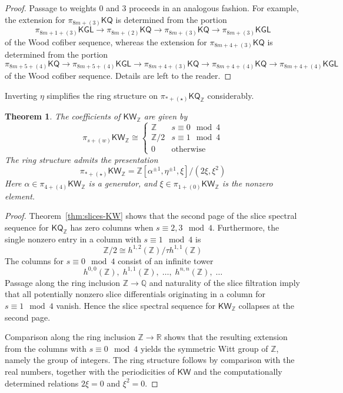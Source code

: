 \documentclass[11pt,hyp,english]{article}
\newcommand{\Z}{\mathbb{Z}}
\newcommand{\Q}{\mathbb{Q}}
\newcommand{\KGL}{\mathsf{KGL}}
\newcommand{\KQ}{\mathsf{KQ}}
\newcommand{\KW}{\mathsf{KW}}
\newcommand{\R}{\mathbb{R}}
\newcommand{\bideg}{(\star)}
\newtheorem{theorem}{Theorem}[section]
\theoremstyle{definition}
\begin{document}
\begin{proof}
Passage to weights $0$ and $3$ proceeds in an analogous fashion.  
For example, the extension for $\pi_{8m+(3)}\KQ$ is determined from the portion
\[
  \pi_{8m+1+(3)}\KGL \to \pi_{8m+(2)}\KQ \to \pi_{8m+(3)}\KQ \to \pi_{8m+(3)}\KGL
\]
of the Wood cofiber sequence, whereas the extension for $\pi_{8m+4+(3)}\KQ$ is determined from the portion
\[
  \pi_{8m+5+(4)}\KQ \to \pi_{8m+5+(4)}\KGL \to \pi_{8m+4+(3)}\KQ \to \pi_{8m+4+(4)}\KQ \to \pi_{8m+4+(4)}\KGL
\]
of the Wood cofiber sequence.  
Details are left to the reader.
\end{proof}
    
Inverting $\eta$ simplifies the ring structure on $\pi_{\ast+\bideg}\KQ_\Z$ considerably.

\begin{theorem}\label{thm:coeff-KW}
The coefficients of $\KW_\Z$ are given by 
\[
  \pi_{s+(w)}\KW_\Z \cong
  \begin{cases} 
    \Z & s \equiv 0 \mod{4} \\ 
    \Z/2 & s \equiv 1 \mod{4} \\ 
    0 & \text{otherwise} 
  \end{cases}
\]
The ring structure admits the presentation
\[
  \pi_{\ast+\bideg}\KW_\Z = \Z[\alpha^{\pm 1}, \eta^{\pm 1}, \xi]/(2\xi,\xi^2)
\]
Here $\alpha \in \pi_{4+(4)}\KW_\Z$ is a generator, and $\xi \in \pi_{1+(0)}\KW_\Z$ is the nonzero element.
\end{theorem}

\begin{proof}
Theorem~\ref{thm:slices-KW} shows that the second page of the slice spectral sequence for $\KQ_\Z$ has zero columns when $s \equiv 2,3 \mod{4}$.  
Furthermore, the single nonzero entry in a column with $s \equiv 1 \mod{4}$ is
\[
  \Z/2 \cong h^{1,2}(\Z) / \tau h^{1,1}(\Z)
\]
The columns for $s \equiv 0 \mod{4}$ consist of an infinite tower 
\[
  h^{0,0}(\Z), \; h^{1,1}(\Z), \; \dotsc, \; h^{n,n}(\Z), \; \dotsc
\]
Passage along the ring inclusion $\Z \to \Q$ and naturality of the slice filtration imply that all potentially nonzero slice differentials originating in a column for $s \equiv 1 \mod{4}$ vanish.  
Hence the slice spectral sequence for $\KW_\Z$ collapses at the second page.  

Comparison along the ring inclusion $\Z \to \R$ shows that the resulting extension from the columns with $s \equiv 0 \mod{4}$ yields the symmetric Witt group of $\Z$, namely the group of integers.  
The ring structure follows by comparison with the real numbers, together with the periodicities of $\KW$ and the computationally determined relations $2\xi = 0$ and $\xi^2 = 0$.
\end{proof}


\printbibliography
\end{document}
